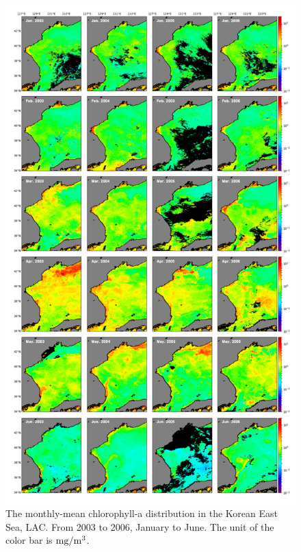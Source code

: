 \begin{figure}
	\centering
	\includegraphics[width=0.8\linewidth]{../images/noname01}
	\caption{The monthly-mean chlorophyll-a distribution in the Korean East Sea, LAC. From 2003 to 2006, January to June. The unit of the color bar is $\rm mg/m^3$.}
	\label{fig:noname01}
\end{figure}
 

